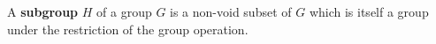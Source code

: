 A \textbf{subgroup} $H$ of a group $G$ is a non-void subset of $G$ which is itself a group under the restriction of the group operation.
